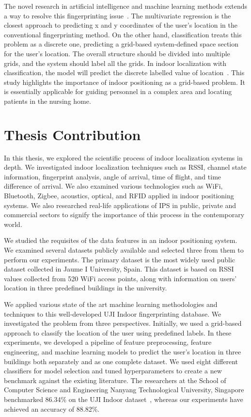 \documentclass[a4paper,singleside,12pt]{report} %
\begin{document}
			The novel research in artificial intelligence and machine learning methods extends a way to resolve this fingerprinting issue~\cite{liu2007survey}. 
			The multivariate regression is the closest approach to predicting x and y coordinates of the user's location in the conventional fingerprinting method. 
			On the other hand, classification treats this problem as a discrete one, predicting a grid-based system-defined space section for the user's location. 
			The overall structure should be divided into multiple grids, and the system should label all the grids. 
			In indoor localization with classification, the model will predict the discrete labelled value of location~\cite{belmannoubi2019stacked}. 
			This study highlights the importance of indoor positioning as a grid-based problem. It is essentially applicable for guiding personnel in a complex area and locating patients in the nursing home. 


		\section{Thesis Contribution}

			In this thesis, we explored the scientific process of indoor localization systems in depth. 
			We investigated indoor localization techniques such as RSSI, channel state information, fingerprint analysis, angle of arrival, time of flight, and time difference of arrival. 
			We also examined various technologies such as WiFi, Bluetooth, Zigbee, acoustics, optical, and RFID applied in indoor positioning systems. 
			We also researched real-life applications of IPS in public, private and commercial sectors to signify the importance of this process in the contemporary world.
			
			We studied the requisites of the data features in an indoor positioning system. 
			We examined several datasets publicly available and selected three from them to perform our experiments. 
			The primary dataset is the most widely used public dataset collected in Jaume I University, Spain. 
			This dataset is based on RSSI values collected from 520 WiFi access points, along with information on users' location in three predefined buildings in the university. 
			
			We applied various state of the art machine learning methodologies and techniques to this well-developed UJI Indoor fingerprinting database. We investigated the problem from three perspectives. 
			Initially, we used a grid-based approach to classify the location of the user using predefined labels. 
			In these experiments, we developed a pipeline of feature preprocessing, feature engineering, and machine learning models to predict the user's location in three buildings both separately and as one complete dataset. 
			We used eight different classifiers for model selection and tuned hyperparameters to create a new benchmark against the existing literature. 
			The researchers at the School of Computer Science and Engineering Nanyang Technological University, Singapore benchmarked 86.34\% on the UJI Indoor dataset~\cite{yean2020feature}, whereas our experiments have achieved an accuracy of 88.82\%. 
			
\end{document}
